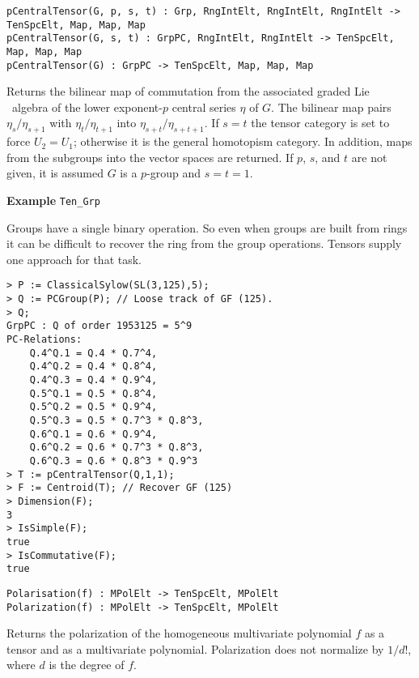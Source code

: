 \color{blue}
{\small \begin{verbatim}
pCentralTensor(G, p, s, t) : Grp, RngIntElt, RngIntElt, RngIntElt -> TenSpcElt, Map, Map, Map
pCentralTensor(G, s, t) : GrpPC, RngIntElt, RngIntElt -> TenSpcElt, Map, Map, Map
pCentralTensor(G) : GrpPC -> TenSpcElt, Map, Map, Map
\end{verbatim} }
\color{black}

Returns the bilinear map of commutation from the associated graded Lie \
algebra of the lower exponent-$p$ central
series $\eta$ of $G$.  The bilinear map pairs $\eta_s/\eta_{s+1}$ with $
\eta_{t}/\eta_{t+1}$ into $\eta_{s+t}/\eta_{s+t+1}$.  If $s=t$ the tensor 
category is set to force $U_2=U_1$; 
otherwise it is the general homotopism category.
In addition, maps from the subgroups into the vector spaces are returned. 
If $p$, $s$, and $t$ are not given, it is assumed $G$ is a $p$-group and $s=t=1$.

\medskip
\begin{framed} {\bf Example} {\tt Ten\_Grp}\\
{\small
Groups have a single binary operation. So even when groups are built from
rings it can be difficult to recover the ring from the group operations.  Tensors
supply one approach for that task.
\begin{lstlisting}[frame=single,basicstyle=\ttfamily\color{black!30!
teal},backgroundcolor=\color{white!70!gray}]
> P := ClassicalSylow(SL(3,125),5);
> Q := PCGroup(P); // Loose track of GF (125).
> Q;
GrpPC : Q of order 1953125 = 5^9
PC-Relations:
    Q.4^Q.1 = Q.4 * Q.7^4, 
    Q.4^Q.2 = Q.4 * Q.8^4, 
    Q.4^Q.3 = Q.4 * Q.9^4, 
    Q.5^Q.1 = Q.5 * Q.8^4, 
    Q.5^Q.2 = Q.5 * Q.9^4, 
    Q.5^Q.3 = Q.5 * Q.7^3 * Q.8^3, 
    Q.6^Q.1 = Q.6 * Q.9^4, 
    Q.6^Q.2 = Q.6 * Q.7^3 * Q.8^3, 
    Q.6^Q.3 = Q.6 * Q.8^3 * Q.9^3
> T := pCentralTensor(Q,1,1);
> F := Centroid(T); // Recover GF (125)
> Dimension(F);
3
> IsSimple(F);
true
> IsCommutative(F);
true
\end{lstlisting}
}
\end{framed}


\color{blue}
{\small \begin{verbatim}
Polarisation(f) : MPolElt -> TenSpcElt, MPolElt
Polarization(f) : MPolElt -> TenSpcElt, MPolElt
\end{verbatim} }
\color{black}

Returns the polarization of the homogeneous multivariate polynomial 
$f$ as a tensor and as a multivariate polynomial.  Polarization does not
normalize by $1/d!$, where $d$ is the degree of $f$.  

